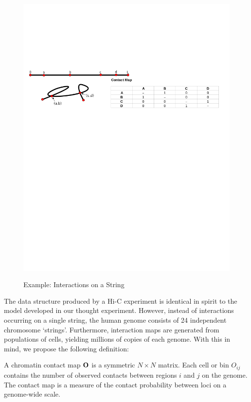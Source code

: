 \begin{figure}[b]
  \centering
  \caption{Example: Interactions on a String}
  \includegraphics[width=\textwidth]{figures/mathematics/strmtx}\label{fig:string}
\end{figure}

The data structure produced by a Hi-C experiment is identical in spirit to the model developed in our thought experiment.  However, instead of
interactions occurring on a single string, the human genome consists of 24 independent chromosome `strings'.  Furthermore, interaction maps are
generated from populations of cells, yielding millions of copies of each genome.  With this in mind, we propose the following definition:

\begin{defn}
  A chromatin contact map $\mathbf{O}$ is a symmetric $N \times N$ matrix.  Each cell or bin $O_{ij}$ contains the number of observed contacts
  between regions $i$ and $j$ on the genome.  The contact map is a measure of the contact probability between loci on a genome-wide scale.
\end{defn}


